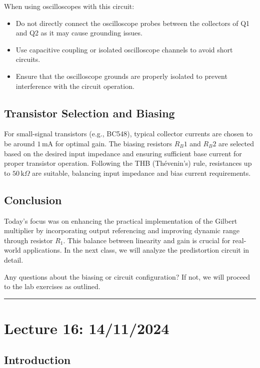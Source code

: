 \documentclass[a4paper,9pt,twoside,openany,twocolumn]{memoir}
\begin{document}
When using oscilloscopes with this circuit:
\begin{itemize}
    \item Do not directly connect the oscilloscope probes between the collectors of Q1 and Q2 as it may cause grounding issues.
    \item Use capacitive coupling or isolated oscilloscope channels to avoid short circuits.
    \item Ensure that the oscilloscope grounds are properly isolated to prevent interference with the circuit operation.
\end{itemize}

\subsection{Transistor Selection and Biasing}

For small-signal transistors (e.g., BC548), typical collector currents are chosen to be around $1\,\text{mA}$ for optimal gain. The biasing resistors $R_B1$ and $R_B2$ are selected based on the desired input impedance and ensuring sufficient base current for proper transistor operation. Following the THB (Thévenin's) rule, resistances up to $50\,\text{k}\Omega$ are suitable, balancing input impedance and bias current requirements.

\subsection{Conclusion}

Today's focus was on enhancing the practical implementation of the Gilbert multiplier by incorporating output referencing and improving dynamic range through resistor $R_1$. This balance between linearity and gain is crucial for real-world applications. In the next class, we will analyze the predistortion circuit in detail.

Any questions about the biasing or circuit configuration? If not, we will proceed to the lab exercises as outlined.
\begin{center}\rule{0.5\linewidth}{0.5pt}\end{center}

\section*{Lecture 16: 14/11/2024}

\subsection{Introduction}
\end{document}

